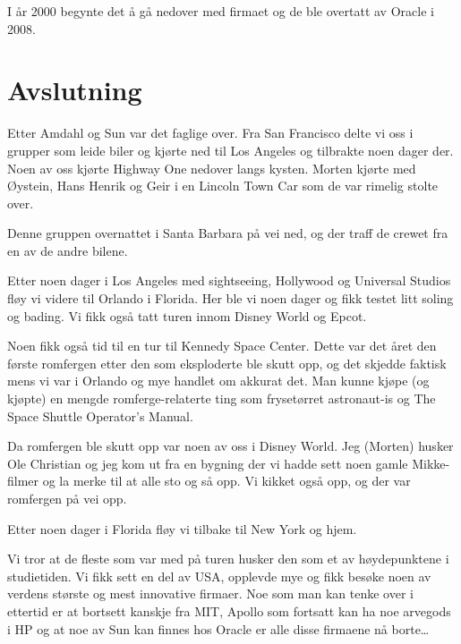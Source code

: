 \documentclass[../../main.tex]{subfiles}
\begin{document}
I år 2000 begynte det å gå nedover med firmaet og de ble overtatt av Oracle i 2008.

\section{Avslutning}

Etter Amdahl og Sun var det faglige over. Fra San Francisco delte vi oss i grupper som leide biler og kjørte ned til Los Angeles og tilbrakte noen dager der. Noen av oss kjørte Highway One nedover langs kysten. Morten kjørte med Øystein, Hans Henrik og Geir i en Lincoln Town Car som de var rimelig stolte over. 

Denne gruppen overnattet i Santa Barbara på vei ned, og der traff de crewet fra en av de andre bilene.

Etter noen dager i Los Angeles med sightseeing, Hollywood og Universal Studios fløy vi videre til Orlando i Florida. Her ble vi noen dager og fikk testet litt soling og bading. Vi fikk også tatt turen innom Disney World og Epcot. 

Noen fikk også tid til en tur til Kennedy Space Center. Dette var det året den første romfergen etter den som eksploderte ble skutt opp, og det skjedde faktisk mens vi var i Orlando og mye handlet om akkurat det. Man kunne kjøpe (og kjøpte) en mengde romferge-relaterte ting som frysetørret astronaut-is og The Space Shuttle Operator’s Manual. 

Da romfergen ble skutt opp var noen av oss i Disney World. Jeg (Morten) husker Ole Christian og jeg kom ut fra en bygning der vi hadde sett noen gamle Mikke-filmer og la merke til at alle sto og så opp. Vi kikket også opp, og der var romfergen på vei opp. 

Etter noen dager i Florida fløy vi tilbake til New York og hjem.

Vi tror at de fleste som var med på turen husker den som et av høydepunktene i studietiden. Vi fikk sett en del av USA, opplevde mye og fikk besøke noen av verdens største og mest innovative firmaer. Noe som man kan tenke over i ettertid er at bortsett kanskje fra MIT, Apollo som fortsatt kan ha noe arvegods i HP og at noe av Sun kan finnes hos Oracle er alle disse firmaene nå borte…
\end{document}
